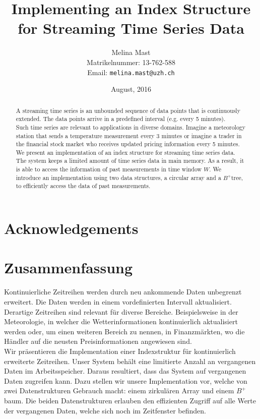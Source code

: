 \documentclass[abstracton,12pt,oneside]{scrreprt}
\title{Implementing an Index Structure for Streaming Time Series Data}
\author{
  Melina Mast\\[-5pt]
  \scriptsize Matrikelnummer: 13-762-588\\[-5pt]
  \scriptsize Email: \texttt{melina.mast@uzh.ch}
}
\date{\vspace*{2cm}August, 2016}
\begin{document}
\maketitle

\chapter*{Acknowledgements}



\begin{abstract}
A streaming time series is an unbounded sequence of data points that is continuously extended. The data points arrive in a predefined interval (e.g. every 5 minutes). \\Such time series are relevant to applications in diverse domains. Imagine a meteorology station that sends a temperature measurement every 3 minutes or imagine a trader in the financial stock market who receives updated pricing information every 5 minutes.\\
We present an implementation of an index structure for streaming time series data. The system keeps a limited amount of time series data in main memory. As a result, it is able to access the information of past measurements in time window $W$. We introduce an implementation using two data structures, a circular array and a $B^+$tree, to efficiently access the data of past measurements. 

\end{abstract}

\chapter*{Zusammenfassung}
Kontinuierliche Zeitreihen werden durch neu ankommende Daten unbegrenzt erweitert. Die Daten werden in einem vordefinierten Intervall aktualisiert.\\
Derartige Zeitreihen sind relevant für diverse Bereiche. Beispielsweise in der Meteorologie, in welcher die Wetterinformationen kontinuierlich aktualisiert werden oder, um einen weiteren Bereich zu nennen, in Finanzmärkten, wo die Händler auf die neusten Preisinformationen angewiesen sind.\\
Wir präsentieren die Implementation einer Indexstruktur für kontinuierlich erweiterte Zeitreihen. Unser System behält eine limitierte Anzahl an vergangenen Daten im Arbeitsspeicher. Daraus resultiert, dass das System auf vergangenen Daten zugreifen kann. Dazu stellen wir unsere Implementation vor, welche von zwei Datenstrukturen Gebrauch macht: einem zirkulären Array und einem $B^+$baum. Die beiden Datenstrukturen erlauben den effizienten Zugriff auf alle Werte der vergangenen Daten, welche sich noch im Zeitfenster befinden.
\end{document}
